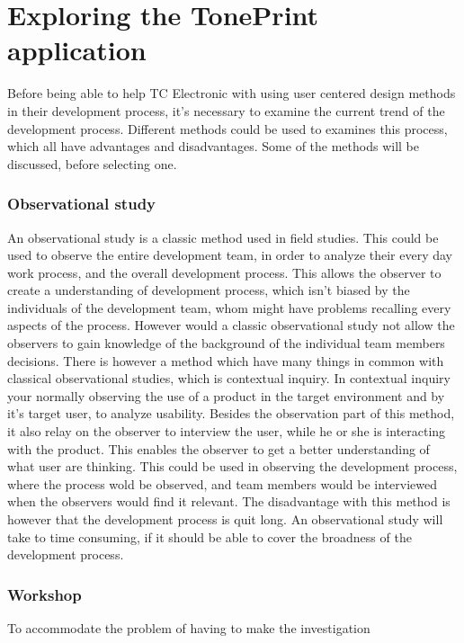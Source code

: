 \chapter{Exploring the TonePrint application}
\label{HeursiticEvaluation}
Before being able to help TC Electronic with using user centered design methods in their development process, it's necessary to examine the current trend of the development process. Different methods could be used to examines this process, which all have advantages and disadvantages. Some of the methods will be discussed, before selecting one.

\subsection*{Observational study}
\label{MethodObservation}
An observational study is a classic method used in field studies. This could be used to observe the entire development team, in order to analyze their every day work process, and the overall development process. This allows the observer to create a understanding of development process, which isn't biased by the individuals of the development team, whom might have problems recalling every aspects of the process. However would a classic observational study not allow the observers to gain knowledge of the background of the individual team members decisions. There is however a method which have many things in common with classical observational studies, which is contextual inquiry. In contextual inquiry your normally observing the use of a product in the target environment and by it's target user, to analyze usability. Besides the observation part of this method, it also relay on the observer to interview the user, while he or she is interacting with the product. This enables the observer to get a better understanding of what user are thinking. This could be used in observing the development process, where the process wold be observed, and team members would be interviewed when the observers would find it relevant. The disadvantage with this method is however that the development process is quit long. An observational study will take to time consuming, if it should be able to cover the broadness of the development process.

\subsection*{Workshop}
\label{MethodWorkshop}
To accommodate the problem of having to make the investigation 

